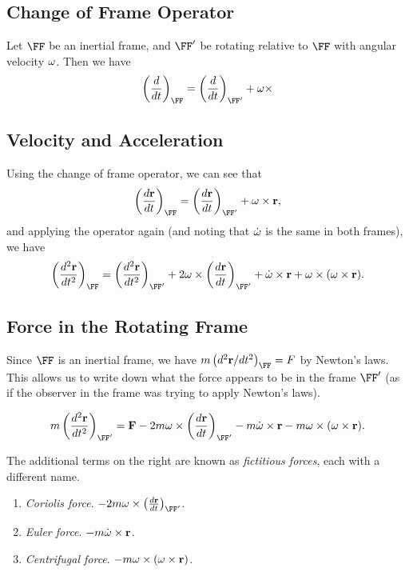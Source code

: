 \documentclass[a4paper]{scrartcl}
\begin{document}
\subsection{Change of Frame Operator}

Let $\FF$ be an inertial frame, and $\FF'$ be rotating relative to $\FF$ with angular velocity $\mathbf{\omega}$.
Then we have
$$
\left(\frac{d}{d t}\right)_{\FF} = \left(\frac{d}{d t}\right)_{\FF'} +\vv \omega \times 
$$

\subsection{Velocity and Acceleration}

Using the change of frame operator, we can see that
$$
\left(\frac{d \vv r}{d t}\right)_{\FF} = \left(\frac{d \vv r}{d t}\right)_{\FF'} +\vv \omega \times \vv r,
$$
and applying the operator again (and noting that $\dot{\mathbf{\omega}}$ is the same in both frames), we have
$$
\left(\frac{d^2 \vv r}{d t^2}\right)_{\FF} = \left(\frac{d^2 \vv r}{d t^2}\right)_{\FF'} + 2 \vv \omega \times \left(\frac{d \vv r}{d t}\right)_{\FF'} + \dot{\vv \omega} \times \vv r + \vv \omega \times (\vv \omega \times \vv r).
$$

\subsection{Force in the Rotating Frame}

Since $\FF$ is an inertial frame, we have $m\left(d^2 \vv r/ dt^2\right)_{\FF} = F$ by Newton's laws. This allows us to write down what the force appears to be in the frame $\FF'$ (as if the observer in the frame was trying to apply Newton's laws).

$$
m \left(\frac{d^2 \vv r}{dt^2}\right)_{\FF'} = \vv F - 2m \vv \omega \times \left(\frac{d \vv r}{d t}\right)_{\FF'} - m\dot{\vv \omega} \times \vv r - m\vv \omega \times (\vv \omega \times \vv r).
$$

The additional terms on the right are known as \emph{fictitious forces}, each with a different name.

\begin{enumerate}
	\item \emph{Coriolis force}. $- 2m \vv \omega \times \left(\frac{d \vv r}{d t}\right)_{\FF'}$.
	\item \emph{Euler force}. $- m\dot{\mathbf{\omega}} \times \mathbf{r}$.
	\item \emph{Centrifugal force}. $- m\mathbf{\omega} \times (\mathbf{\omega} \times \mathbf{r})$.
\end{enumerate}
\end{document}
